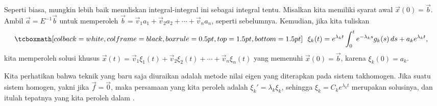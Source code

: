 \medskip

Seperti biasa,
mungkin lebih baik menuliskan integral-integral ini sebagai integral tentu.  
Misalkan kita memiliki syarat awal $\vec{x}(0) = \vec{b}$.
Ambil $\vec{a} = E^{-1} \vec{b}$ untuk memperoleh
$\vec{b} = \vec{v}_1 a_1 + \vec{v}_2 a_2 + \cdots + \vec{v}_n a_n$,
seperti sebelumnya.
Kemudian, jika kita tuliskan 
\begin{equation*}
\mybxbg{~~
\xi_k(t) =  e^{\lambda_k t} 
\int_0^t e^{-\lambda_k s} g_k(s) \,ds + a_k e^{\lambda_k t} ,
~~}
\end{equation*}
kita memperoleh solusi khusus
$\vec{x}(t) =
\vec{v}_1 \xi_1(t) + 
\vec{v}_2 \xi_2(t) + \cdots +
\vec{v}_n \xi_n(t)$ yang memenuhi $\vec{x}(0) = \vec{b}$,
karena $\xi_k(0) = a_k$.

Kita perhatikan bahwa teknik yang baru saja diuraikan adalah metode
nilai eigen yang diterapkan pada sistem takhomogen.  Jika suatu sistem homogen,
yakni jika $\vec{f}=\vec{0}$, maka persamaan yang kita peroleh adalah
$\xi_k' = \lambda_k \xi_k$, sehingga $\xi_k = C_k e^{\lambda_k t}$ merupakan
solusinya, dan itulah tepatnya yang kita peroleh dalam
.

